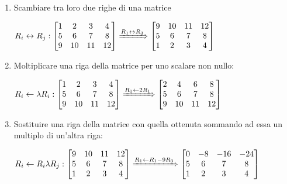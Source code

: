 \documentclass{article}
\begin{document}
	\begin{enumerate}[label=\Roman*.]
		\item Scambiare tra loro due righe di una matrice

		      $R_i\leftrightarrow R_j:
			      \begin{bmatrix}
				      1 & 2  & 3  & 4  \\
				      5 & 6  & 7  & 8  \\
				      9 & 10 & 11 & 12
			      \end{bmatrix}\xRightarrow{R_1\leftrightarrow R_3}\begin{bmatrix}
				      9 & 10 & 11 & 12 \\
				      5 & 6  & 7  & 8  \\
				      1 & 2  & 3  & 4
			      \end{bmatrix}$

		\item Moltiplicare una riga della matrice per uno scalare non nullo:

		      $R_i\leftarrow\lambda R_i:
			      \begin{bmatrix}
				      1 & 2  & 3  & 4  \\
				      5 & 6  & 7  & 8  \\
				      9 & 10 & 11 & 12
			      \end{bmatrix}\xRightarrow{R_1\leftarrow2R_1}\begin{bmatrix}
				      2 & 4  & 6  & 8  \\
				      5 & 6  & 7  & 8  \\
				      9 & 10 & 11 & 12
			      \end{bmatrix}$


		\item Sostituire una riga della matrice con quella ottenuta sommando ad essa un multiplo di un'altra riga:

		      $R_i\leftarrow R_i\lambda R_j:
			      \begin{bmatrix}
				      9 & 10 & 11 & 12 \\
				      5 & 6  & 7  & 8  \\
				      1 & 2  & 3  & 4
			      \end{bmatrix}\xRightarrow{R_1\leftarrow R_1-9R_3}\begin{bmatrix}
				      0 & -8 & -16 & -24 \\
				      5 & 6  & 7   & 8   \\
				      1 & 2  & 3   & 4
			      \end{bmatrix}$
	\end{enumerate}
\end{document}
